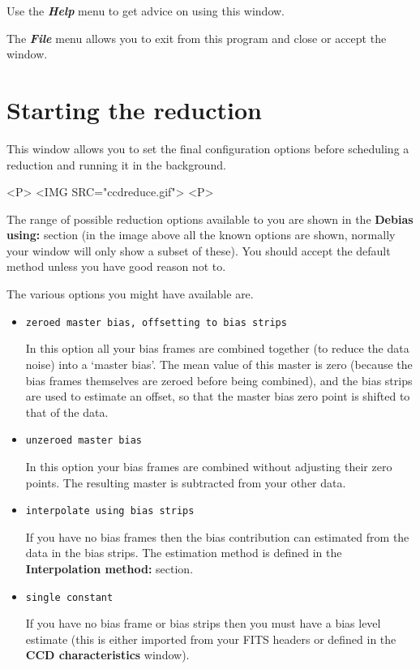 \documentclass[11pt]{article}
\newcommand{\htmlref}[2]{#1}
\newcommand{\xlabel}[1]{}
\newcommand{\menu}[1]{{\bf \em #1}}
\newcommand{\wlab}[1]{{\bf #1}}
\newcommand{\text}[1]{{\tt #1}}
\begin{document}
Use the \menu{Help} menu to get advice on using this window.

The \menu{File} menu allows you to exit from this program and close or
accept the window.

\section{Starting the reduction \xlabel{CCDReduceWindow}}
This window allows you to set the final configuration options before
scheduling a reduction and running it in the background.
\begin{rawhtml}
<P>
<IMG SRC="ccdreduce.gif">
<P>
\end{rawhtml}


The\xlabel{CCDReduceDebias} range of possible reduction options
available to you are shown in the \wlab{Debias using:} section (in the
image above all the known options are shown, normally your window will
only show a subset of these). You should accept the default method
unless you have good reason not to.

The various options you might have available are.
\begin{itemize}
\item \text{zeroed master bias, offsetting to bias strips}

In this option all your bias frames are combined together (to reduce
the data noise) into a `master bias'. The mean value of this master is
zero (because the bias frames themselves are zeroed before being
combined), and the bias strips are used to estimate an offset, so that
the master bias zero point is shifted to that of the data.

\item \text{unzeroed master bias}

In this option your bias frames are combined without adjusting their
zero points. The resulting master is subtracted from your other data.

\item \text{interpolate using bias strips}

If you have no bias frames then the bias contribution can estimated
from the data in the bias strips. The estimation method is defined in
the \wlab{Interpolation method:} section.

\item \text{single constant}

If you have no bias frame or bias strips then you must have a bias
level estimate (this is either imported from your FITS headers or
defined in the \htmlref{\wlab{CCD characteristics}}
{CCDSetCCDGlobalsWindow} window).

\end{itemize}
\end{document}
